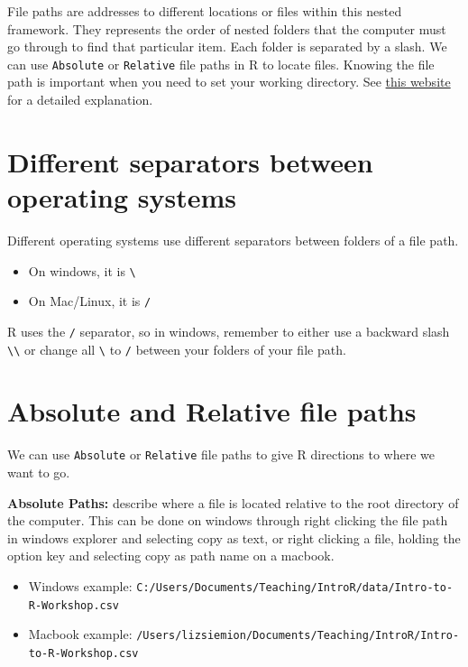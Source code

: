 \documentclass[
]{book}
\providecommand{\tightlist}{%
  \setlength{\itemsep}{0pt}\setlength{\parskip}{0pt}}
\begin{document}
File paths are addresses to different locations or files within this nested framework. They represents the order of nested folders that the computer must go through to find that particular item. Each folder is separated by a slash. We can use \texttt{Absolute} or \texttt{Relative} file paths in R to locate files. Knowing the file path is important when you need to set your working directory. See \href{https://www.r4epi.com/file-paths}{this website} for a detailed explanation.

\section{Different separators between operating systems}\label{different-separators-between-operating-systems}

Different operating systems use different separators between folders of a file path.

\begin{itemize}
\tightlist
\item
  On windows, it is \texttt{\textbackslash{}}
\item
  On Mac/Linux, it is \texttt{/}
\end{itemize}

R uses the \texttt{/} separator, so in windows, remember to either use a backward slash \texttt{\textbackslash{}\textbackslash{}} or change all \texttt{\textbackslash{}} to \texttt{/} between your folders of your file path.

\section{Absolute and Relative file paths}\label{absolute-and-relative-file-paths}

We can use \texttt{Absolute} or \texttt{Relative} file paths to give R directions to where we want to go.

\textbf{Absolute Paths:} describe where a file is located relative to the root directory of the computer. This can be done on windows through right clicking the file path in windows explorer and selecting copy as text, or right clicking a file, holding the option key and selecting copy as path name on a macbook.

\begin{itemize}
\tightlist
\item
  Windows example:
  \texttt{C:/Users/Documents/Teaching/IntroR/data/Intro-to-R-Workshop.csv}
\item
  Macbook example:
  \texttt{/Users/lizsiemion/Documents/Teaching/IntroR/Intro-to-R-Workshop.csv}
\end{itemize}
\end{document}
